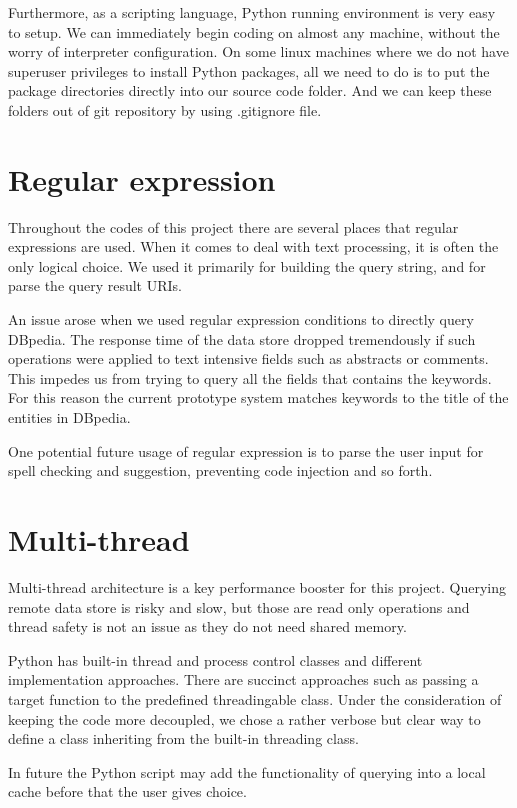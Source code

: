 \documentclass[12pt]{cls}
\begin{document}
Furthermore, as a scripting language, Python running environment is very easy to setup. We can immediately begin coding on almost any machine, without the worry of interpreter configuration. On some linux machines where we do not have superuser privileges to install Python packages, all we need to do is to put the package directories directly into our source code folder. And we can keep these folders out of git repository by using .gitignore file.

\section{Regular expression}

Throughout the codes of this project there are several places that regular expressions are used. When it comes to deal with text processing, it is often the only logical choice. We used it primarily for building the query string, and for parse the query result URIs.

An issue arose when we used regular expression conditions to directly query DBpedia. The response time of the data store dropped tremendously if such operations were applied to text intensive fields such as abstracts or comments. This impedes us from trying to query all the fields that contains the keywords. For this reason the current prototype system matches keywords to the title of the entities in DBpedia.

One potential future usage of regular expression is to parse the user input for spell checking and suggestion, preventing code injection and so forth.

\section{Multi-thread}

Multi-thread architecture is a key performance booster for this project. Querying remote data store is risky and slow, but those are read only operations and thread safety is not an issue as they do not need shared memory.

Python has built-in thread and process control classes and different implementation approaches. There are succinct approaches such as passing a target function to the predefined threadingable class. Under the consideration of keeping the code more decoupled, we chose a rather verbose but clear way to define a class inheriting from the built-in threading class.

In future the Python script may add the functionality of querying into a local cache before that the user gives choice.
\end{document}
